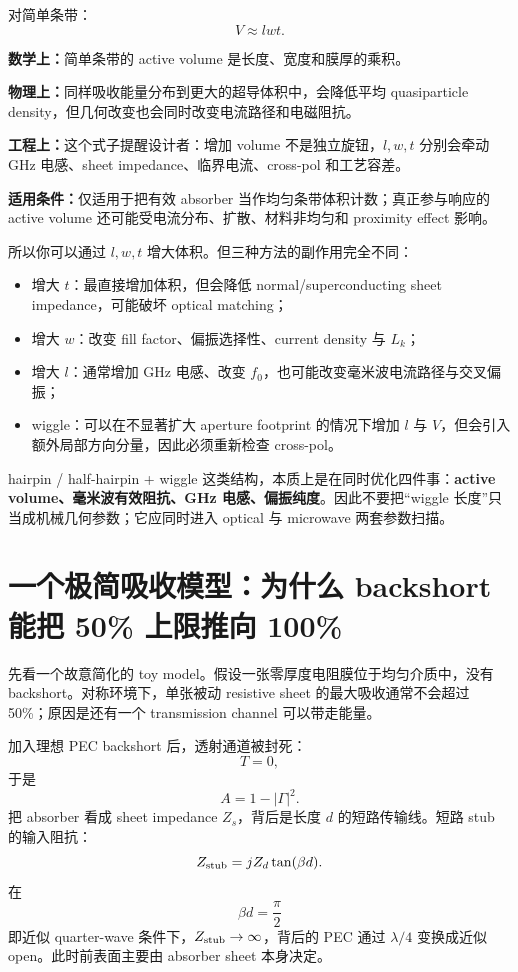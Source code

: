 \documentclass[11pt,a4paper,openany]{ctexrep}
\newcommand{\formulaexplain}[4]{%
\begin{formulaguidebox}
\textbf{\color{KidBlue}数学上：}#1\par
\textbf{\color{KidTeal}物理上：}#2\par
\textbf{\color{KidGold!55!black}工程上：}#3\par
\textbf{\color{KidRed}适用条件：}#4
\end{formulaguidebox}%
}
\begin{document}
对简单条带：
\[
V\approx lwt.
\]
\formulaexplain
{简单条带的 active volume 是长度、宽度和膜厚的乘积。}
{同样吸收能量分布到更大的超导体积中，会降低平均 quasiparticle density，但几何改变也会同时改变电流路径和电磁阻抗。}
{这个式子提醒设计者：增加 volume 不是独立旋钮，$l,w,t$ 分别会牵动 GHz 电感、sheet impedance、临界电流、cross-pol 和工艺容差。}
{仅适用于把有效 absorber 当作均匀条带体积计数；真正参与响应的 active volume 还可能受电流分布、扩散、材料非均匀和 proximity effect 影响。}
所以你可以通过 $l,w,t$ 增大体积。但三种方法的副作用完全不同：
\begin{itemize}
  \item 增大 $t$：最直接增加体积，但会降低 normal/superconducting sheet impedance，可能破坏 optical matching；
  \item 增大 $w$：改变 fill factor、偏振选择性、current density 与 $L_k$；
  \item 增大 $l$：通常增加 GHz 电感、改变 $f_0$，也可能改变毫米波电流路径与交叉偏振；
  \item wiggle：可以在不显著扩大 aperture footprint 的情况下增加 $l$ 与 $V$，但会引入额外局部方向分量，因此必须重新检查 cross-pol。
\end{itemize}

\begin{projectbox}
hairpin / half-hairpin + wiggle 这类结构，本质上是在同时优化四件事：\textbf{active volume、毫米波有效阻抗、GHz 电感、偏振纯度}。因此不要把“wiggle 长度”只当成机械几何参数；它应同时进入 optical 与 microwave 两套参数扫描。
\end{projectbox}

\section{一个极简吸收模型：为什么 backshort 能把 50\% 上限推向 100\%}

先看一个故意简化的 toy model。假设一张零厚度电阻膜位于均匀介质中，没有 backshort。对称环境下，单张被动 resistive sheet 的最大吸收通常不会超过 50\%；原因是还有一个 transmission channel 可以带走能量。

加入理想 PEC backshort 后，透射通道被封死：
\[
T=0,
\]
于是
\[
A=1-|\Gamma|^2.
\]
把 absorber 看成 sheet impedance $Z_s$，背后是长度 $d$ 的短路传输线。短路 stub 的输入阻抗：
\[
Z_{\rm stub}=jZ_d\tan(\beta d).
\]
在
\[
\beta d=\frac{\pi}{2}
\]
即近似 quarter-wave 条件下，$Z_{\rm stub}\rightarrow\infty$，背后的 PEC 通过 $\lambda/4$ 变换成近似 open。此时前表面主要由 absorber sheet 本身决定。
\end{document}
